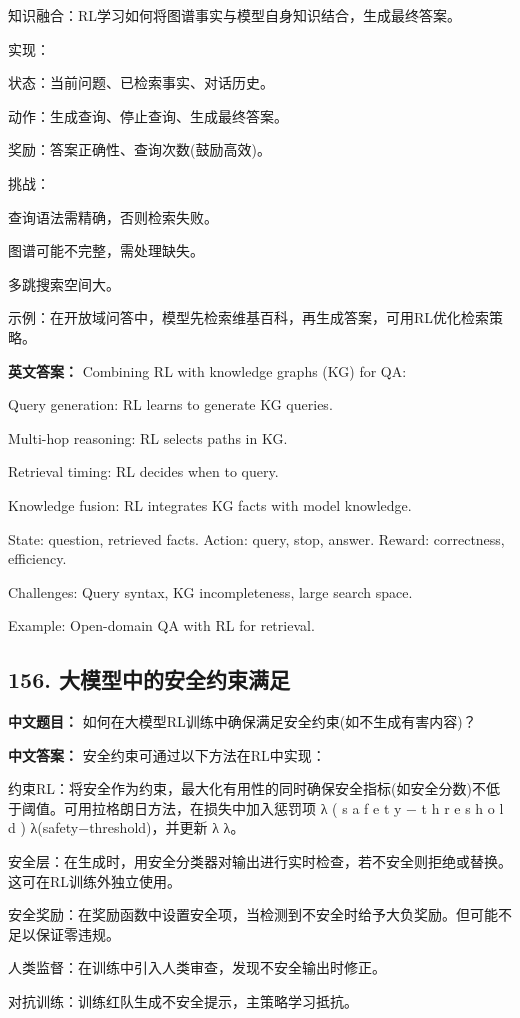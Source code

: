\documentclass[10pt,a4paper]{ctexart}
\begin{document}
知识融合：RL学习如何将图谱事实与模型自身知识结合，生成最终答案。

实现：

状态：当前问题、已检索事实、对话历史。

动作：生成查询、停止查询、生成最终答案。

奖励：答案正确性、查询次数(鼓励高效)。

挑战：

查询语法需精确，否则检索失败。

图谱可能不完整，需处理缺失。

多跳搜索空间大。

示例：在开放域问答中，模型先检索维基百科，再生成答案，可用RL优化检索策略。

\textbf{英文答案：}
Combining RL with knowledge graphs (KG) for QA:

Query generation: RL learns to generate KG queries.

Multi-hop reasoning: RL selects paths in KG.

Retrieval timing: RL decides when to query.

Knowledge fusion: RL integrates KG facts with model knowledge.

State: question, retrieved facts. Action: query, stop, answer. Reward: correctness, efficiency.

Challenges: Query syntax, KG incompleteness, large search space.

Example: Open-domain QA with RL for retrieval.

\subsection*{156. 大模型中的安全约束满足}
\textbf{中文题目：} 如何在大模型RL训练中确保满足安全约束(如不生成有害内容)？

\textbf{中文答案：}
安全约束可通过以下方法在RL中实现：

约束RL：将安全作为约束，最大化有用性的同时确保安全指标(如安全分数)不低于阈值。可用拉格朗日方法，在损失中加入惩罚项 
λ
(
s
a
f
e
t
y
−
t
h
r
e
s
h
o
l
d
)
λ(safety−threshold)，并更新
λ
λ。

安全层：在生成时，用安全分类器对输出进行实时检查，若不安全则拒绝或替换。这可在RL训练外独立使用。

安全奖励：在奖励函数中设置安全项，当检测到不安全时给予大负奖励。但可能不足以保证零违规。

人类监督：在训练中引入人类审查，发现不安全输出时修正。

对抗训练：训练红队生成不安全提示，主策略学习抵抗。
\end{document}

